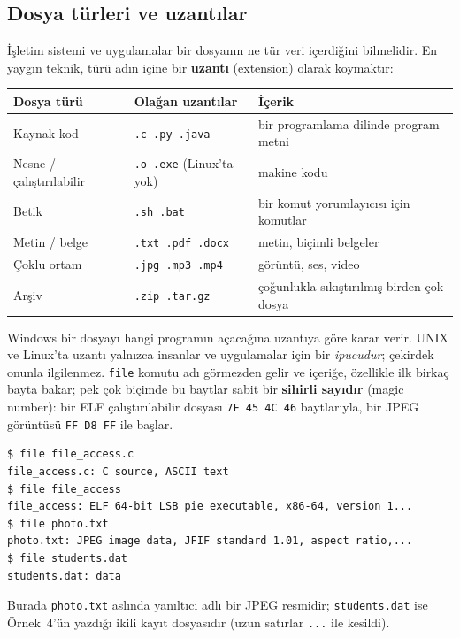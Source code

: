 \documentclass[11pt,a4paper]{article}
\newcommand{\term}[1]{\textbf{\color{mintdeep}#1}}
\newcommand{\cmd}[1]{\texttt{#1}}
\begin{document}
\subsection{Dosya türleri ve uzantılar}

İşletim sistemi ve uygulamalar bir dosyanın ne tür veri içerdiğini bilmelidir. En yaygın teknik, türü adın içine bir \term{uzantı} (extension) olarak koymaktır:

\begin{center}
\renewcommand{\arraystretch}{1.25}
\begin{tabular}{@{}lll@{}}
\toprule
\textbf{Dosya türü} & \textbf{Olağan uzantılar} & \textbf{İçerik} \\
\midrule
Kaynak kod & \texttt{.c .py .java} & bir programlama dilinde program metni \\
Nesne / çalıştırılabilir & \texttt{.o .exe} (Linux'ta yok) & makine kodu \\
Betik & \texttt{.sh .bat} & bir komut yorumlayıcısı için komutlar \\
Metin / belge & \texttt{.txt .pdf .docx} & metin, biçimli belgeler \\
Çoklu ortam & \texttt{.jpg .mp3 .mp4} & görüntü, ses, video \\
Arşiv & \texttt{.zip .tar.gz} & çoğunlukla sıkıştırılmış birden çok dosya \\
\bottomrule
\end{tabular}
\end{center}

Windows bir dosyayı hangi programın açacağına uzantıya göre karar verir. UNIX ve Linux'ta uzantı yalnızca insanlar ve uygulamalar için bir \emph{ipucudur}; çekirdek onunla ilgilenmez. \cmd{file} komutu adı görmezden gelir ve içeriğe, özellikle ilk birkaç bayta bakar; pek çok biçimde bu baytlar sabit bir \term{sihirli sayıdır} (magic number): bir ELF çalıştırılabilir dosyası \texttt{7F 45 4C 46} baytlarıyla, bir JPEG görüntüsü \texttt{FF D8 FF} ile başlar.

\begin{lstlisting}[style=term]
$ file file_access.c
file_access.c: C source, ASCII text
$ file file_access
file_access: ELF 64-bit LSB pie executable, x86-64, version 1...
$ file photo.txt
photo.txt: JPEG image data, JFIF standard 1.01, aspect ratio,...
$ file students.dat
students.dat: data
\end{lstlisting}
Burada \texttt{photo.txt} aslında yanıltıcı adlı bir JPEG resmidir; \texttt{students.dat} ise Örnek~4'ün yazdığı ikili kayıt dosyasıdır (uzun satırlar \texttt{...} ile kesildi).
\end{document}
